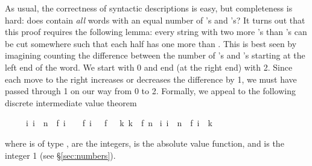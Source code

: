 \begin{isabellebody}
\begin{isamarkuptext}
As usual, the correctness of syntactic descriptions is easy, but completeness
is hard: does  contain \emph{all} words with an equal number of
's and 's? It turns out that this proof requires the
following lemma: every string with two more 's than 's can be cut somewhere such that each half has one more  than
. This is best seen by imagining counting the difference between the
number of 's and 's starting at the left end of the
word. We start with 0 and end (at the right end) with 2. Since each move to the
right increases or decreases the difference by 1, we must have passed through
1 on our way from 0 to 2. Formally, we appeal to the following discrete
intermediate value theorem 
\begin{isabelle}%
\ \ \ \ \ {\isasymlbrakk}{\isasymforall}i{\isachardot}\ i\ {\isacharless}\ n\ {\isasymlongrightarrow}\ {\isasymbar}f\ {\isacharparenleft}i\ {\isacharplus}\ {}{\isacharparenright}\ {\isacharminus}\ f\ i{\isasymbar}\ {\isasymle}\ {\isacharhash}{}{\isacharsemicolon}\ f\ {}\ {\isasymle}\ k{\isacharsemicolon}\ k\ {\isasymle}\ f\ n{\isasymrbrakk}\isanewline
\isaindent{\ \ \ \ \ }{\isasymLongrightarrow}\ {\isasymexists}i{\isachardot}\ i\ {\isasymle}\ n\ {\isasymand}\ f\ i\ {\isacharequal}\ k%
\end{isabelle}
where  is of type ,  are the integers,
\isa{{\isasymbar}{\isachardot}{\isasymbar}} is the absolute value function, and  is the
integer 1 (see \S\ref{sec:numbers}).


\end{isamarkuptext}
\end{isabellebody}
